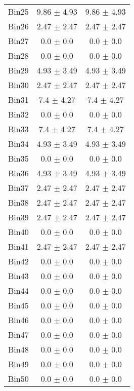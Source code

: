\begin{tabular}{|c|c|c|}
     Bin25 & 9.86 $\pm$ 4.93 & 9.86 $\pm$ 4.93 \\ \cline{1-3} 
     Bin26 & 2.47 $\pm$ 2.47 & 2.47 $\pm$ 2.47 \\ \cline{1-3} 
     Bin27 & 0.0 $\pm$ 0.0 & 0.0 $\pm$ 0.0 \\ \cline{1-3} 
     Bin28 & 0.0 $\pm$ 0.0 & 0.0 $\pm$ 0.0 \\ \cline{1-3} 
     Bin29 & 4.93 $\pm$ 3.49 & 4.93 $\pm$ 3.49 \\ \cline{1-3} 
     Bin30 & 2.47 $\pm$ 2.47 & 2.47 $\pm$ 2.47 \\ \cline{1-3} 
     Bin31 & 7.4 $\pm$ 4.27 & 7.4 $\pm$ 4.27 \\ \cline{1-3} 
     Bin32 & 0.0 $\pm$ 0.0 & 0.0 $\pm$ 0.0 \\ \cline{1-3} 
     Bin33 & 7.4 $\pm$ 4.27 & 7.4 $\pm$ 4.27 \\ \cline{1-3} 
     Bin34 & 4.93 $\pm$ 3.49 & 4.93 $\pm$ 3.49 \\ \cline{1-3} 
     Bin35 & 0.0 $\pm$ 0.0 & 0.0 $\pm$ 0.0 \\ \cline{1-3} 
     Bin36 & 4.93 $\pm$ 3.49 & 4.93 $\pm$ 3.49 \\ \cline{1-3} 
     Bin37 & 2.47 $\pm$ 2.47 & 2.47 $\pm$ 2.47 \\ \cline{1-3} 
     Bin38 & 2.47 $\pm$ 2.47 & 2.47 $\pm$ 2.47 \\ \cline{1-3} 
     Bin39 & 2.47 $\pm$ 2.47 & 2.47 $\pm$ 2.47 \\ \cline{1-3} 
     Bin40 & 0.0 $\pm$ 0.0 & 0.0 $\pm$ 0.0 \\ \cline{1-3} 
     Bin41 & 2.47 $\pm$ 2.47 & 2.47 $\pm$ 2.47 \\ \cline{1-3} 
     Bin42 & 0.0 $\pm$ 0.0 & 0.0 $\pm$ 0.0 \\ \cline{1-3} 
     Bin43 & 0.0 $\pm$ 0.0 & 0.0 $\pm$ 0.0 \\ \cline{1-3} 
     Bin44 & 0.0 $\pm$ 0.0 & 0.0 $\pm$ 0.0 \\ \cline{1-3} 
     Bin45 & 0.0 $\pm$ 0.0 & 0.0 $\pm$ 0.0 \\ \cline{1-3} 
     Bin46 & 0.0 $\pm$ 0.0 & 0.0 $\pm$ 0.0 \\ \cline{1-3} 
     Bin47 & 0.0 $\pm$ 0.0 & 0.0 $\pm$ 0.0 \\ \cline{1-3} 
     Bin48 & 0.0 $\pm$ 0.0 & 0.0 $\pm$ 0.0 \\ \cline{1-3} 
     Bin49 & 0.0 $\pm$ 0.0 & 0.0 $\pm$ 0.0 \\ \cline{1-3} 
     Bin50 & 0.0 $\pm$ 0.0 & 0.0 $\pm$ 0.0 \\ \cline{1-3} 

\end{tabular}
